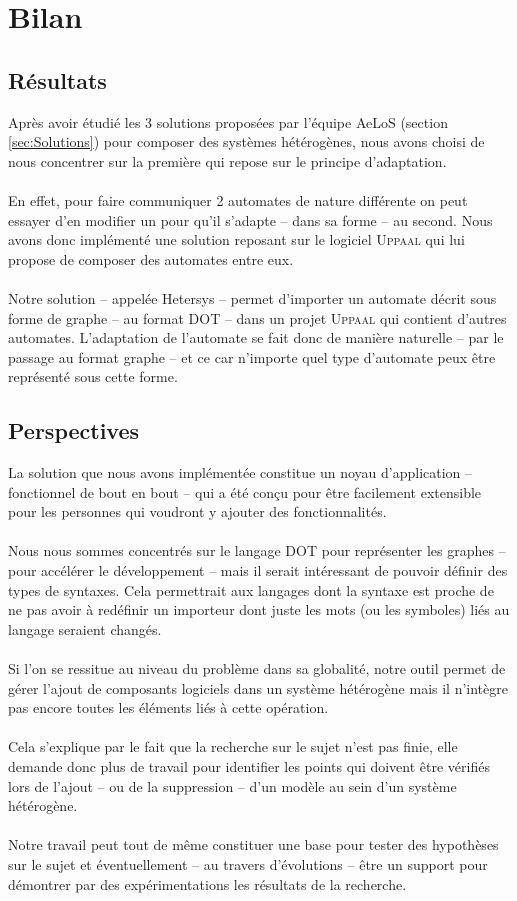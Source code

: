 \documentclass[12pt,a4paper]{report}
\begin{document}
\chapter{Bilan}
\section{Résultats}
Après avoir étudié les 3 solutions proposées par l'équipe AeLoS (section \ref{sec:Solutions}) pour composer des systèmes hétérogènes, 
nous avons choisi de nous concentrer sur la première qui repose sur le principe d'adaptation.
\\\\
En effet, pour faire communiquer 2 automates de nature différente on peut essayer d'en modifier un 
pour qu'il s'adapte -- dans sa forme -- au second. Nous avons donc implémenté une solution reposant sur 
le logiciel \textsc{Uppaal} qui lui propose de composer des automates entre eux.
\\\\
Notre solution -- appelée Hetersys -- permet d'importer un automate décrit sous forme de graphe -- au format DOT --
dans un projet \textsc{Uppaal} qui contient d'autres automates. L'adaptation de l'automate se fait donc de manière naturelle
-- par le passage au format graphe -- et ce car n'importe quel type d'automate peux être représenté sous cette forme.

\section{Perspectives}
La solution que nous avons implémentée constitue un noyau d'application -- fonctionnel de bout en bout -- qui a été conçu 
pour être facilement extensible pour les personnes qui voudront y ajouter des fonctionnalités. 
\\\\
Nous nous sommes concentrés sur
le langage DOT pour représenter les graphes -- pour accélérer le développement -- mais il serait intéressant de pouvoir définir des types de syntaxes.
Cela permettrait aux langages dont la syntaxe est proche de ne pas avoir à redéfinir un importeur dont juste les mots (ou les symboles)
liés au langage seraient changés. 
\\\\
Si l'on se ressitue au niveau du problème dans sa globalité, notre outil permet de gérer l'ajout de composants logiciels
dans un système hétérogène mais il n'intègre pas encore toutes les éléments liés à cette opération. 
\\\\
Cela s'explique par le fait que la recherche sur le sujet n'est pas finie, elle demande donc plus de travail pour identifier
les points qui doivent être vérifiés lors de l'ajout -- ou de la suppression -- d'un modèle au sein d'un système hétérogène.
\\\\
Notre travail peut tout de même constituer une base pour tester des hypothèses sur le sujet et éventuellement  -- au travers
d'évolutions -- être un support pour démontrer par des expérimentations les résultats de la recherche.


\end{document}
